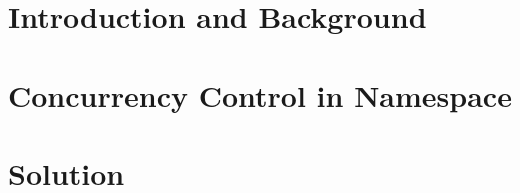 \documentclass[a4paper,11pt,twoside,onecolumn,final,openright]{book}
\begin{document}


\pagestyle{headings}




\part{Introduction and Background}
\thispagestyle{empty}
\thispagestyle{empty}

\newpage
\thispagestyle{empty}


     


\part{Concurrency Control in Namespace}
\thispagestyle{empty}
\thispagestyle{empty}

\newpage
\thispagestyle{empty}





\part{Solution}
\thispagestyle{empty}
\thispagestyle{empty}
\end{document}

